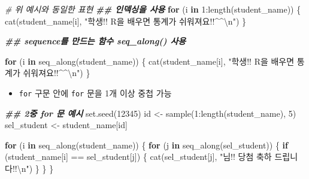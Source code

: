\documentclass[
  11pt,
]{krantz}
\newenvironment{Shaded}{\begin{snugshade}}{\end{snugshade}}
\newcommand{\CommentTok}[1]{\textcolor[rgb]{0.37,0.37,0.37}{\textit{#1}}}
\newcommand{\ControlFlowTok}[1]{\textcolor[rgb]{0.27,0.27,0.27}{\textbf{#1}}}
\newcommand{\DecValTok}[1]{\textcolor[rgb]{0.06,0.06,0.06}{#1}}
\newcommand{\DocumentationTok}[1]{\textcolor[rgb]{0.37,0.37,0.37}{\textbf{\textit{#1}}}}
\newcommand{\FunctionTok}[1]{\textcolor[rgb]{0,0,0}{#1}}
\newcommand{\NormalTok}[1]{#1}
\newcommand{\OtherTok}[1]{\textcolor[rgb]{0.37,0.37,0.37}{#1}}
\newcommand{\SpecialCharTok}[1]{\textcolor[rgb]{0,0,0}{#1}}
\newcommand{\StringTok}[1]{\textcolor[rgb]{0.5,0.5,0.5}{#1}}
\providecommand{\tightlist}{%
  \setlength{\itemsep}{0pt}\setlength{\parskip}{0pt}}
\begin{document}
\begin{Shaded}
\begin{Highlighting}[]
\CommentTok{\# 위 예시와 동일한 표현}
\DocumentationTok{\#\# 인덱싱을 사용}
\ControlFlowTok{for}\NormalTok{ (i }\ControlFlowTok{in} \DecValTok{1}\SpecialCharTok{:}\FunctionTok{length}\NormalTok{(student\_name)) \{}
  \FunctionTok{cat}\NormalTok{(student\_name[i], }\StringTok{"학생!! R을 배우면 통계가 쉬워져요!!\^{}\^{}}\SpecialCharTok{\textbackslash{}n}\StringTok{"}\NormalTok{)}
\NormalTok{\}}

\DocumentationTok{\#\# sequence를 만드는 함수 seq\_along() 사용}

\ControlFlowTok{for}\NormalTok{ (i }\ControlFlowTok{in} \FunctionTok{seq\_along}\NormalTok{(student\_name)) \{}
  \FunctionTok{cat}\NormalTok{(student\_name[i], }\StringTok{"학생!! R을 배우면 통계가 쉬워져요!!\^{}\^{}}\SpecialCharTok{\textbackslash{}n}\StringTok{"}\NormalTok{)}
\NormalTok{\}}
\end{Highlighting}
\end{Shaded}

\normalsize

\begin{itemize}
\tightlist
\item
  \texttt{for} 구문 안에 \texttt{for} 문을 1개 이상 중첩 가능
\end{itemize}

\footnotesize

\begin{Shaded}
\begin{Highlighting}[]
\DocumentationTok{\#\# 2중 for 문 예시}
\FunctionTok{set.seed}\NormalTok{(}\DecValTok{12345}\NormalTok{)}
\NormalTok{id }\OtherTok{\textless{}{-}} \FunctionTok{sample}\NormalTok{(}\DecValTok{1}\SpecialCharTok{:}\FunctionTok{length}\NormalTok{(student\_name), }\DecValTok{5}\NormalTok{)}
\NormalTok{sel\_student }\OtherTok{\textless{}{-}}\NormalTok{ student\_name[id]}

\ControlFlowTok{for}\NormalTok{ (i }\ControlFlowTok{in} \FunctionTok{seq\_along}\NormalTok{(student\_name)) \{}
  \ControlFlowTok{for}\NormalTok{ (j }\ControlFlowTok{in} \FunctionTok{seq\_along}\NormalTok{(sel\_student)) \{}
    \ControlFlowTok{if}\NormalTok{ (student\_name[i] }\SpecialCharTok{==}\NormalTok{ sel\_student[j]) \{}
      \FunctionTok{cat}\NormalTok{(sel\_student[j], }\StringTok{"님!! 당첨 축하 드립니다!!}\SpecialCharTok{\textbackslash{}n}\StringTok{"}\NormalTok{)}
\NormalTok{    \}}
\NormalTok{  \}}
\NormalTok{\}}
\end{Highlighting}
\end{Shaded}
\end{document}
